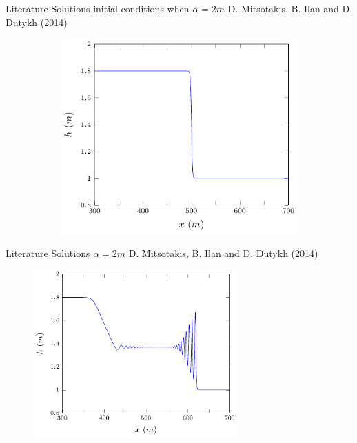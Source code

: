 \documentclass[pdf]{beamer}
\begin{document}
\begin{frame}{Literature Solutions initial conditions when $\alpha = 2m$}
	D. Mitsotakis, B. Ilan and D. Dutykh (2014)
	\begin{figure}
		\centering
		\begin{subfigure}{0.7\textwidth}
			\includegraphics[width=\textwidth]{../Pics/init/DBs6/1-figure0.pdf}
		\end{subfigure}%
	\end{figure}
\end{frame}
\begin{frame} {Literature Solutions $\alpha = 2m$}
	D. Mitsotakis, B. Ilan and D. Dutykh (2014)
	\begin{figure}
		\includegraphics[width=0.7\textwidth]{../Pics/litrec/HankRec.pdf}
	\end{figure}
\end{frame}
\end{document}
